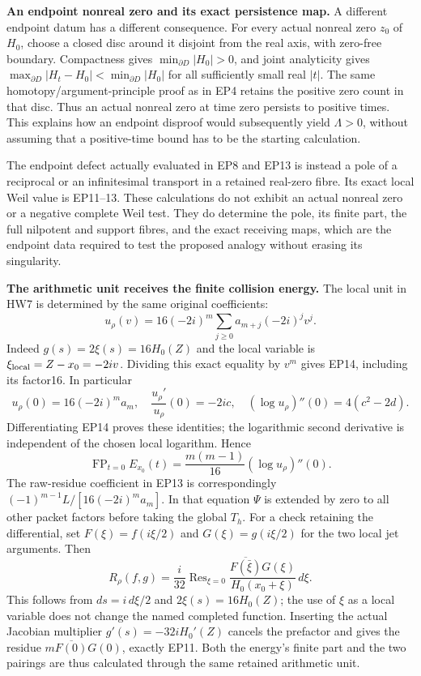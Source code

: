 \documentclass[11pt,a4paper]{article}
\theoremstyle{definition}\newtheorem{definition}[theorem]{Definition}
\begin{document}
\EP\textbf{An endpoint nonreal zero and its exact persistence map.}
A different endpoint datum has a different consequence. For every
actual nonreal zero $z_0$ of $H_0$, choose a closed disc around it
disjoint from the real axis, with zero-free boundary. Compactness
gives $\min_{\partial D}|H_0|>0$, and joint analyticity gives
$\max_{\partial D}|H_t-H_0|<\min_{\partial D}|H_0|$ for all
sufficiently small real $|t|$. The same homotopy/argument-principle
proof as in EP4 retains the positive zero count in that disc.
Thus an actual nonreal zero at time zero persists to positive
times. This explains how an endpoint disproof would subsequently
yield $\Lambda>0$, without assuming that a positive-time bound
has to be the starting calculation.

The endpoint defect actually evaluated in EP8 and EP13 is instead
a pole of a reciprocal or an infinitesimal transport in a retained
real-zero fibre. Its exact local Weil value is EP11--13. These
calculations do not exhibit an actual nonreal zero or a negative
complete Weil test. They do determine the pole, its finite part,
the full nilpotent and support fibres, and the exact receiving
maps, which are the endpoint data required to test the proposed
analogy without erasing its singularity.

\EP\textbf{The arithmetic unit receives the finite collision energy.}
The local unit in HW7 is determined by the same original coefficients:
\[
 u_\rho(v)=16(-2i)^m\sum_{j\ge0}a_{m+j}(-2i)^jv^j.
 \tag{EP14}\label{ep:unit}
\]
Indeed $g(s)=2\xi(s)=16H_0(Z)$ and the local variable is
$\xi_{\rm local}=Z-x_0=-2iv$.
Dividing this exact equality by $v^m$ gives EP14, including its factor16.
In particular
\[
 u_\rho(0)=16(-2i)^ma_m,\quad
 \frac{u_\rho'}{u_\rho}(0)=-2ic,\quad
 (\log u_\rho)''(0)=4(c^2-2d).
 \tag{EP15}
\]
Differentiating EP14 proves these identities; the logarithmic second
derivative is independent of the chosen local logarithm. Hence
\[
 \operatorname{FP}_{t=0}E_{x_0}(t)
        =\frac{m(m-1)}{16}(\log u_\rho)''(0).
 \tag{EP16}
\]
The raw-residue coefficient in EP13 is correspondingly
$(-1)^{m-1}L/[16(-2i)^ma_m]$. In that equation $\Psi$ is extended
by zero to all other packet factors before taking the global $T_h$.
For a check retaining the differential, set
$F(\xi)=f(i\xi/2)$ and $G(\xi)=g(i\xi/2)$ for the two local jet
arguments. Then
\[
 R_\rho(f,g)=\frac{i}{32}\operatorname{Res}_{\xi=0}
     \frac{\overline{F(\bar\xi)}G(\xi)}{H_0(x_0+\xi)}\,d\xi.
 \tag{EP17}
\]
This follows from $ds=i\,d\xi/2$ and $2\xi(s)=16H_0(Z)$;
the use of $\xi$ as a local variable does not change the named
completed function. Inserting the actual Jacobian multiplier
$g'(s)=-32iH_0'(Z)$ cancels the prefactor and gives the residue
$m\overline{F(0)}G(0)$, exactly EP11. Both the energy's finite
part and the two pairings are thus calculated through the same
retained arithmetic unit.
\end{document}
